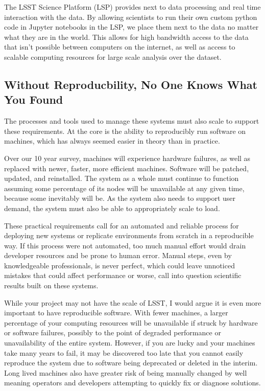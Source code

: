 \documentclass[11pt,twoside]{article}
\begin{document}
The LSST Science Platform (LSP) provides next to data processing and real
time interaction with the data.  By allowing scientists to run their own
custom python code in Jupyter notebooks in the LSP, we place them next to
the data no matter what they are in the world.
This allows for high bandwidth access to the data that isn't possible between
computers on the internet, as well as access to scalable computing resources
for large scale analysis over the dataset.

\subsection{Without Reproducbility, No One Knows What You Found}

The processes and tools used to manage these systems must also scale to
support these requirements.  At the core is the ability to
reproducibly run software on machines, which has always seemed easier
in theory than in practice.

Over our 10 year survey, machines will experience hardware failures, as
well as replaced with newer, faster, more efficient machines.
Software will be patched, updated, and reinstalled.  The system as a whole
must continue to function assuming some percentage of its nodes will be
unavailable at any given time, because some inevitably will be.
As the system also needs to support user demand, the system
must also be able to appropriately scale to load.

These practical requirements call for an automated and reliable process for
deploying new systems or replicate environments from scratch in a reproducible
way.  If this process were not automated, too much manual effort would drain
developer resources and be prone to human error.  Manual steps, even by knowledgeable
professionals, is never perfect, which could leave unnoticed mistakes that could
affect performance or worse, call into question scientific results built on
these systems.

While your project may not have the scale of LSST, I would argue it is
even more important to have reproducible software.  With fewer machines,
a larger percentage of your computing resources will be unavailable if struck by
hardware or software failures, possibly to the point of degraded performance
or unavailability of the entire system.  However, if you are lucky and your
machines take many years to fail, it may be discovered too late that you cannot
easily reproduce the system due to software being deprecated or deleted in the
interim.  Long lived machines also have greater risk of being manually changed by
well meaning operators and developers attempting to quickly fix or diagnose
solutions.
\end{document}
